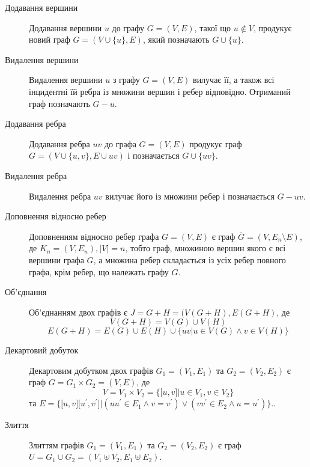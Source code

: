 \begin{description}
\item[Додавання вершини] Додавання вершини $u$ до графу $G=(V,E)$, такої що $u \not\in V$, продукує новий граф $G=(V \cup \lbrace u \rbrace,E)$, який позначають $G \cup \lbrace u \rbrace$.
\item[Видалення вершини] Видалення вершини $u$ з графу $G=(V,E)$ вилучає її, а також всі інцидентні їй ребра із множини вершин і ребер відповідно. Отриманий граф позначають $G-u$.
\item[Додавання ребра] Додавання ребра $uv$ до графа $G=(V,E)$ продукує граф $G=(V \cup \lbrace u,v \rbrace, E \cup uv)$ і позначається $G \cup \lbrace uv \rbrace$.
\item[Видалення ребра] Видалення ребра $uv$ вилучає його із множини ребер і позначається $G-uv$.
\item[Доповнення відносно ребер] Доповненням відносно ребер графа $G=(V,E)$ є граф $\overline G=(V,E_n \setminus E)$, де $K_n=(V,E_n), \vert V \vert=n$, тобто граф, множиною вершин якого є всі вершини графа $G$, а множина ребер складається із усіх ребер повного графа, крім ребер, що належать графу $G$.
\item[Об'єднання] Об'єднанням двох графів є $J=G+H=(V(G+H),E(G+H)$, де $$V(G+H)=V(G) \cup V(H)$$ $$E(G+H)=E(G) \cup E(H) \cup \lbrace uv \vert u \in V(G) \land v \in V(H) \rbrace$$
\item[Декартовий добуток] Декартовим добутком двох графів $G_1=(V_1,E_1)$ та $G_2=(V_2,E_2)$ є граф $G=G_1 \times G_2=(V,E)$, де $$V=V_1 \times V_2=\lbrace \lbrack u,v \rbrack \vert u \in V_1, v \in V_2 \rbrace$$ та $E=\lbrace \lbrack u,v \rbrack \lbrack u^\prime,v^\prime \rbrack \vert (uu^\prime \in E_1 \land v=v^\prime) \lor (vv^\prime \in E_2 \land u=u^\prime) \rbrace.$.
\item[Злиття] Злиттям графів $G_1=(V_1,E_1)$ та $G_2=(V_2,E_2)$ є граф $U=G_1 \cup G_2=(V_1 \uplus V_2,E_1 \uplus E_2)$.
\end{description}
